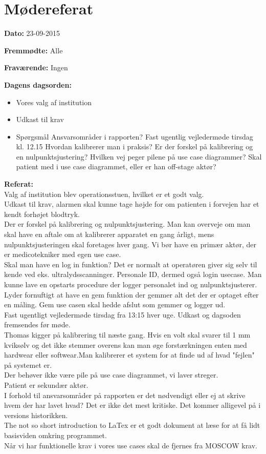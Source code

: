 \chapter{Mødereferat}

\textbf{Dato:} 23-09-2015

\textbf{Fremmødte:} Alle

\textbf{Fraværende:} Ingen

\textbf{Dagens dagsorden:}
\begin{itemize}
	\item Vores valg af institution
	\item Udkast til krav
	\item Spørgsmål
	\subitem Ansvarsområder i rapporten?
	\subitem Fast ugentlig vejledermøde tirsdag kl. 12.15
	\subitem Hvordan kalibrerer man i praksis?
	\subitem Er der forskel på kalibrering og en nulpunktsjustering?
	\subitem Hvilken vej peger pilene på use case diagrammer?
	\subitem Skal patient med i use case diagrammet, eller er han off-stage aktør?
\end{itemize}

\textbf{Referat:}
\\Valg af institution blev operationsstuen, hvilket er et godt valg. 
\\Udkast til krav, alarmen skal kunne tage højde for om patienten i forvejen har et kendt forhøjet blodtryk.
\\Der er forskel på kalibrering og nulpunktsjustering. Man kan overveje om man skal have en aftale om at kalibrerer apparatet en gang årligt, mens nulpunktsjusteringen skal foretages hver gang. Vi bør have en primær aktør, der er medicotekniker med egen use case. 
\\Skal man have en log in funktion? Det er normalt at operatøren giver sig selv til kende ved eks. ultralydsscanninger. Personale ID, dermed også login usecase. Man kunne lave en opstarts procedure der logger personalet ind og nulpunktsjusterer.
\\Lyder fornuftigt at have en gem funktion der gemmer alt det der er optaget efter en måling. Gem use casen skal hedde afslut som gemmer og logger ud.
\\Fast ugentligt vejledermøde tirsdag fra 13:15 hver uge. Udkast og dagsoden fremsendes før møde.
\\Thomas kigger på kalibrering til næste gang. Hvis en volt skal svarer til 1 mm kviksølv og det ikke stemmer overens kan man øge forstærkningen enten med hardwear eller softwear.Man kalibrerer et system for at finde ud af hvad "fejlen" på systemet er.
\\Der behøver ikke være pile på use case diagrammet, vi laver streger.
\\Patient er sekundær aktør.
\\I forhold til ansvarsområder på rapporten er det nødvendigt eller ej at skrive hvem der har lavet hvad? Det er ikke det mest kritiske. Det kommer alligevel på i versions historikken.
\\The not so short introduction to LaTex er et godt dokument at læse for at få lidt basisviden omkring programmet.
\\Når vi har funktionelle krav i vores use cases skal de fjernes fra MOSCOW krav.